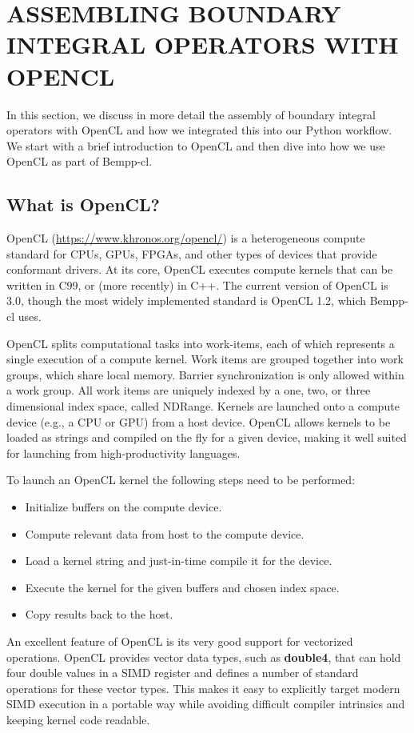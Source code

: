 \section{ASSEMBLING BOUNDARY INTEGRAL OPERATORS WITH OPENCL}

In this section, we discuss in more detail the assembly of boundary integral operators with OpenCL
and how we integrated this into our Python workflow. We start with a brief introduction to OpenCL and then
dive into how we use OpenCL as part of Bempp-cl.

\subsection{What is OpenCL?}

OpenCL (\url{https://www.khronos.org/opencl/}) is a heterogeneous compute standard for CPUs, GPUs, FPGAs, and other types of devices that provide conformant drivers. At its core, OpenCL executes compute kernels that can be written in C99, or (more recently) in C++. The current version of OpenCL is 3.0, though the most widely implemented standard is OpenCL 1.2, which Bempp-cl uses.

OpenCL splits computational tasks into work-items, each of which represents a single execution of a compute kernel. Work items are grouped together into work groups, which share local memory. Barrier synchronization is only allowed within a work group. All work items are uniquely indexed by a one, two, or three dimensional index space, called NDRange. Kernels are launched onto a compute device (e.g., a CPU or GPU) from a host device. OpenCL allows kernels to be loaded as strings and compiled on the fly for a given device, making it well suited for launching from high-productivity languages.

To launch an OpenCL kernel the following steps need to be performed:
\begin{itemize}
	\item Initialize buffers on the compute device.
	\item Compute relevant data from host to the compute device.
	\item Load a kernel string and just-in-time compile it for the device.
	\item Execute the kernel for the given buffers and chosen index space.
	\item Copy results back to the host.
\end{itemize}
An excellent feature of OpenCL is its very good support for vectorized operations. OpenCL provides vector data types, such as \textbf{double4}, that can hold four double values in a SIMD register and defines a number of standard operations for these vector types. This makes it easy to explicitly target modern SIMD execution in a portable way while avoiding difficult compiler intrinsics and keeping kernel code readable.

